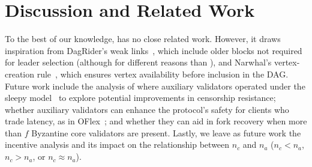 \section{Discussion and Related Work} \label{sec:related}
To the best of our knowledge, \sysname has no close related work. However, it draws inspiration from DagRider's weak links~\cite{dag-rider}, which include older blocks not required for leader selection (although for different reasons than \sysname), and Narwhal's vertex-creation rule~\cite{narwhal}, which ensures vertex availability before inclusion in the DAG.
%
Future work include the analysis of \sysname where auxiliary validators operated under the sleepy model~\cite{pass2017sleepy} to explore potential improvements in censorship resistance; whether auxiliary validators can enhance the protocol's safety for clients who trade latency, as in OFlex~\cite{malkhi2019flexible, oflex}; and whether they can aid in fork recovery when more than $f$ Byzantine core validators are present. Lastly, we leave as future work the incentive analysis and its impact on the relationship between $n_c$ and $n_a$ ($n_c < n_a$, $n_c > n_a$, or $n_c \approx n_a$).